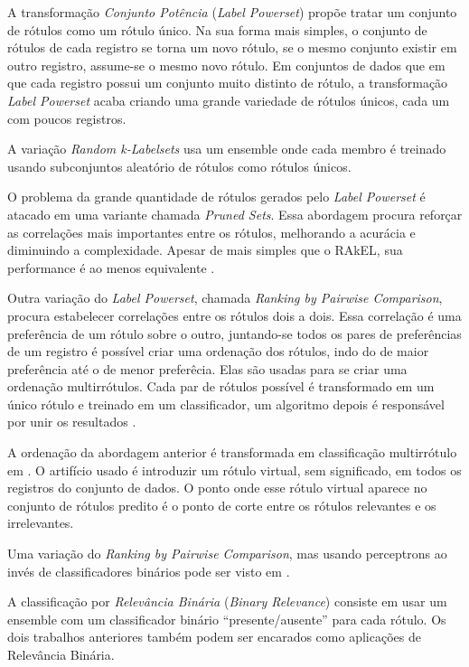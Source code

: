 \documentclass[runningheads,a4paper]{llncs}
\begin{document}
A transformação \emph{Conjunto Potência} (\textit{Label Powerset}) propõe tratar um conjunto de rótulos como um rótulo único. Na sua forma mais simples, o conjunto de rótulos de cada registro se torna um novo rótulo, se o mesmo conjunto existir em outro registro, assume-se o mesmo novo rótulo.
Em conjuntos de dados que em que cada registro possui um conjunto muito distinto de rótulo, a transformação \textit{Label Powerset} acaba criando uma grande variedade de rótulos únicos, cada um com poucos registros.

A variação \emph{Random k-Labelsets} \cite{Tsoumakas2007-wm} usa um ensemble onde cada membro é treinado usando subconjuntos aleatório de rótulos como rótulos únicos.

O problema da grande quantidade de rótulos gerados pelo \textit{Label Powerset} é atacado em uma variante chamada \textit{Pruned Sets}. Essa abordagem procura reforçar as correlações mais importantes entre os rótulos, melhorando a acurácia e diminuindo a complexidade. Apesar de mais simples que o RAkEL, sua performance é ao menos equivalente \cite{Read2008-bt}.

Outra variação do \textit{Label Powerset}, chamada \textit{Ranking by Pairwise Comparison}, procura estabelecer correlações entre os rótulos dois a dois. Essa correlação é uma preferência de um rótulo sobre o outro, juntando-se todos os pares de preferências de um registro é possível criar uma ordenação dos rótulos, indo do de maior preferência até o de menor preferêcia. Elas são usadas para se criar uma ordenação multirrótulos. Cada par de rótulos possível é transformado em um único rótulo e treinado em um classificador, um algoritmo depois é responsável por unir os resultados \cite{Hullermeier2008-co}.

A ordenação da abordagem anterior é transformada em classificação multirrótulo em \cite{Furnkranz2008-rf}. O artifício usado é introduzir um rótulo virtual, sem significado, em todos os registros do conjunto de dados. O ponto onde esse rótulo virtual aparece no conjunto de rótulos predito é o ponto de corte entre os rótulos relevantes e os irrelevantes.

Uma variação do \textit{Ranking by Pairwise Comparison}, mas usando perceptrons ao invés de classificadores binários pode ser visto em \cite{Mencia2008-rh}.

A classificação por \emph{Relevância Binária} (\textit{Binary Relevance}) consiste em usar um ensemble com um classificador binário “presente/ausente” para cada rótulo. Os dois trabalhos anteriores também podem ser encarados como aplicações de Relevância Binária.
\end{document}
